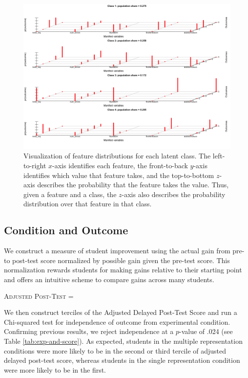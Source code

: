 \documentclass{edm_template}
\begin{document}
\begin{figure}[htbp]
\centering
\includegraphics[scale=0.4]{lca-class-viz.png}
\caption{Visualization of feature distributions for each latent class. The left-to-right $x$-axis identifies each feature, the front-to-back $y$-axis identifies which value that feature takes, and the top-to-bottom $z$-axis describes the probability that the feature takes the value. Thus, given a feature and a class, the $z$-axis also describes the probability distribution over that feature in that class.}
\label{fig:lca-class-viz}
\end{figure}


\subsection{Condition and Outcome} 
We construct a measure of student improvement using the actual gain from pre- to post-test score normalized by possible gain given the pre-test score. This normalization rewards students for making gains relative to their starting point and offers an intuitive scheme to compare gains across many students.
\begin{center}
\textsc{Adjusted Post-Test} = 
\end{center}

We then construct terciles of the Adjusted Delayed Post-Test Score and run a Chi-squared test for independence of outcome from experimental condition. Confirming previous results, we reject independence at a $p$-value of .024 (see Table \ref{tab:exp-and-score}). As expected, students in the multiple representation conditions were more likely to be in the second or third tercile of adjusted delayed post-test score, whereas students in the single representation condition were more likely to be in the first.
\end{document}
